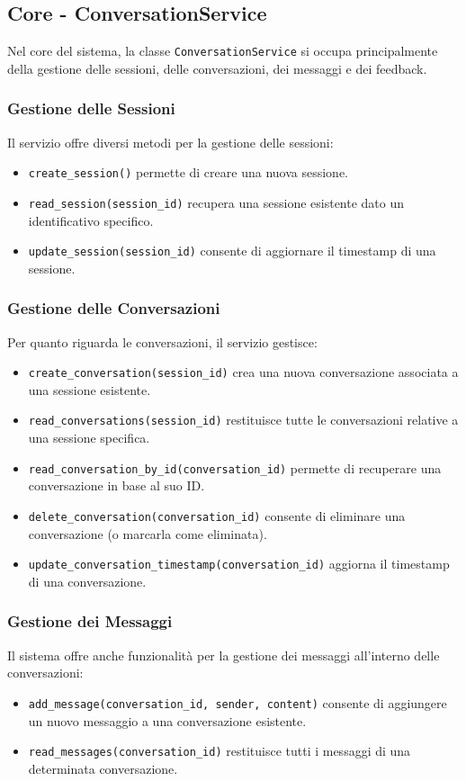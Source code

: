 \subsection*{Core - ConversationService}
Nel core del sistema, la classe \texttt{ConversationService} si occupa principalmente della gestione delle sessioni, delle conversazioni, dei messaggi e dei feedback.

\subsubsection*{Gestione delle Sessioni}
Il servizio offre diversi metodi per la gestione delle sessioni:
\begin{itemize}
    \item \texttt{create\_session()} permette di creare una nuova sessione.
    \item \texttt{read\_session(session\_id)} recupera una sessione esistente dato un identificativo specifico.
    \item \texttt{update\_session(session\_id)} consente di aggiornare il timestamp di una sessione.
\end{itemize}

\subsubsection*{Gestione delle Conversazioni}
Per quanto riguarda le conversazioni, il servizio gestisce:
\begin{itemize}
    \item \texttt{create\_conversation(session\_id)} crea una nuova conversazione associata a una sessione esistente.
    \item \texttt{read\_conversations(session\_id)} restituisce tutte le conversazioni relative a una sessione specifica.
    \item \texttt{read\_conversation\_by\_id(conversation\_id)} permette di recuperare una conversazione in base al suo ID.
    \item \texttt{delete\_conversation(conversation\_id)} consente di eliminare una conversazione (o marcarla come eliminata).
    \item \texttt{update\_conversation\_timestamp(conversation\_id)} aggiorna il timestamp di una conversazione.
\end{itemize}

\subsubsection*{Gestione dei Messaggi}
Il sistema offre anche funzionalità per la gestione dei messaggi all’interno delle conversazioni:
\begin{itemize}
    \item \texttt{add\_message(conversation\_id, sender, content)} consente di aggiungere un nuovo messaggio a una conversazione esistente.
    \item \texttt{read\_messages(conversation\_id)} restituisce tutti i messaggi di una determinata conversazione.
\end{itemize}

